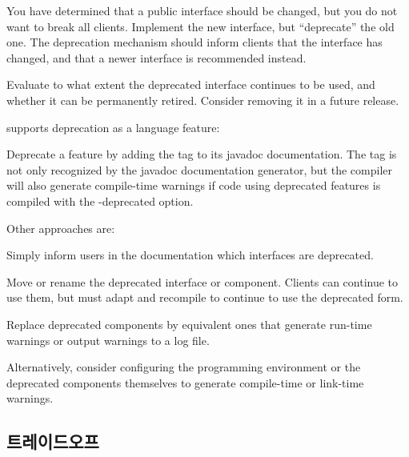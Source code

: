 \documentclass[a4paper,10pt,twoside]{book}
\begin{document}
\begin{bulletlist}
\item You have determined that a public interface should be changed, but you do not want to break all clients. Implement the new interface, but ``deprecate'' the old one. The deprecation mechanism should inform clients that the interface has changed, and that a newer interface is recommended instead.

\item Evaluate to what extent the deprecated interface continues to be used, and whether it can be permanently retired. Consider removing it in a future release.

\item {} supports deprecation as a language feature:
\begin{bulletlist}
\item Deprecate a feature by adding the tag  to its javadoc documentation. The tag is not only recognized by the javadoc documentation generator, but the compiler will also generate compile-time warnings if code using deprecated features is compiled with the -deprecated option.
\end{bulletlist}

\item Other approaches are:

\begin{bulletlist}
\item Simply inform users in the documentation which interfaces are deprecated.

\item Move or rename the deprecated interface or component. Clients can continue to use them, but must adapt and recompile to continue to use the deprecated form.

\item Replace deprecated components by equivalent ones that generate run-time warnings or output warnings to a log file. 

\item Alternatively, consider configuring the programming environment or the deprecated components themselves to generate compile-time or link-time warnings.
\end{bulletlist}
\end{bulletlist}

\subsection*{트레이드오프}
\end{document}
